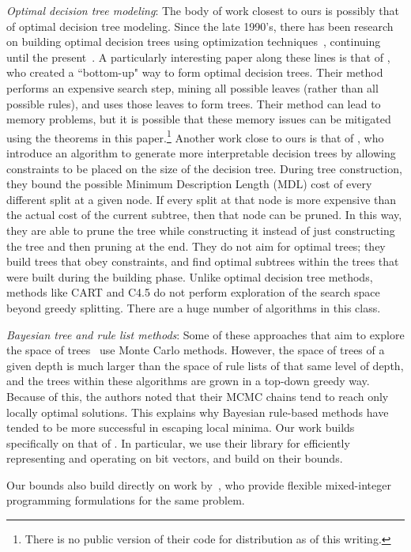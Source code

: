 \textit{Optimal decision tree modeling}: The body of work closest to ours is possibly that of optimal decision tree modeling.
%
Since the late 1990's, there has been research on building optimal decision trees
using optimization techniques~\citep{Bennett96optimaldecision,dobkininduction},
continuing until the present~\citep{FarhangfarGZ08}.
%
A particularly interesting paper along these lines is that of \citet{NijssenFromont2010}, who created a ``bottom-up" way to form optimal decision trees. Their method performs an expensive search step, mining all possible leaves (rather than all possible rules), and uses those leaves to form trees. Their method can lead to memory problems, but it is possible that these memory issues can be mitigated using the theorems in this paper.\footnote{There is no public version of their code for distribution as of this writing.} Another work close to ours is that of \citet{GarofalakisHyRaSh00}, who introduce an algorithm to generate more interpretable decision trees by allowing constraints to be placed on the size of the decision tree. During tree construction, they bound the possible Minimum Description Length (MDL) cost of every different split at a given node. If every split at that node is more expensive than the actual cost of the current subtree, then that node can be pruned. In this way, they are able to prune the tree while constructing it instead of just constructing the tree and then pruning at the end. They do not aim for optimal trees; they build trees that obey constraints, and find optimal subtrees within the trees that were built during the building phase.
Unlike optimal decision tree methods, methods like
CART \citep{Breiman84} and C4.5 \citep{Quinlan93} do not perform exploration of the search space beyond greedy splitting. There are a huge number of algorithms in this class.

\textit{Bayesian tree and rule list methods}: Some of these approaches that aim to explore
the space of trees~\citep{Dension:1998hl,Chipman:2002hc,Chipman10} use Monte Carlo methods.
%
However, the space of trees of a given depth is much larger than the space of
rule lists of that same level of depth, and the trees within these algorithms
are grown in a top-down greedy way.
%
Because of this, the authors noted that their MCMC chains tend to reach only
locally optimal solutions.
%
This explains why Bayesian rule-based methods \citep{LethamRuMcMa15,YangRuSe16} have tended to be more successful in escaping local minima.
%
Our work builds specifically on that of \citet{YangRuSe16}.
%
In particular, we use their library for efficiently representing and
operating on bit vectors, and build on their bounds.
%
\begin{kdd} %
Our bounds also build directly on work by~\citet{RudinEr15}, who provide
flexible mixed-integer programming formulations for the same problem.
\end{kdd}

